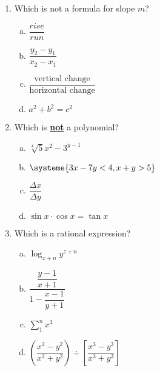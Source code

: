 \documentclass[12pt, letterpaper]{article}
\begin{document}
	\begin{enumerate}[resume]
		\item Which is not a formula for slope $ m $?
		
		\begin{multicols}{4}
		\begin{enumerate}[a. ]
				\item $ \dfrac{rise}{run} $
				\item $ \dfrac{y_2 - y_1}{x_2 - x_1} $
				\item $ \dfrac{\text{vertical change}}{\text{horizontal change}} $
				\item $ a^2 + b^2 = c^2 $
		\end{enumerate}
	\end{multicols}
	
		\item Which is \textbf{\underline{not}} a polynomial?
		
		\begin{multicols}{2}
		\begin{enumerate}[a. ]
			
				\item $ \sqrt[4]{5} x^2 - 3^{y - 1} $
				\item $ \systeme{3x - 7y < 4, x + y > 5} $
				\item $ \dfrac{\Delta x}{\Delta y} $
				\item $ \sin x \cdot \cos x = \tan x $
		\end{enumerate}
	\end{multicols}
	
		\item Which is a rational expression?
		
		\begin{multicols}{2}
		\begin{enumerate}[a. ]
				
					\item $ \log_{x + n} y^{z + n} $
					\item $ \dfrac{\dfrac{y - 1}{x + 1}}{1 - \dfrac{x - 1}{y + 1}} $
					\item $ \sum_{1}^{n} x^3 $
					\item $ \left(\dfrac{x^2 - y^2}{x^2 + y^2}\right) \div \left[\dfrac{x^3 - y ^3}{x^3 + y^3}\right] $
				
		\end{enumerate}
	\end{multicols}
	
	\end{enumerate}
\end{document}
